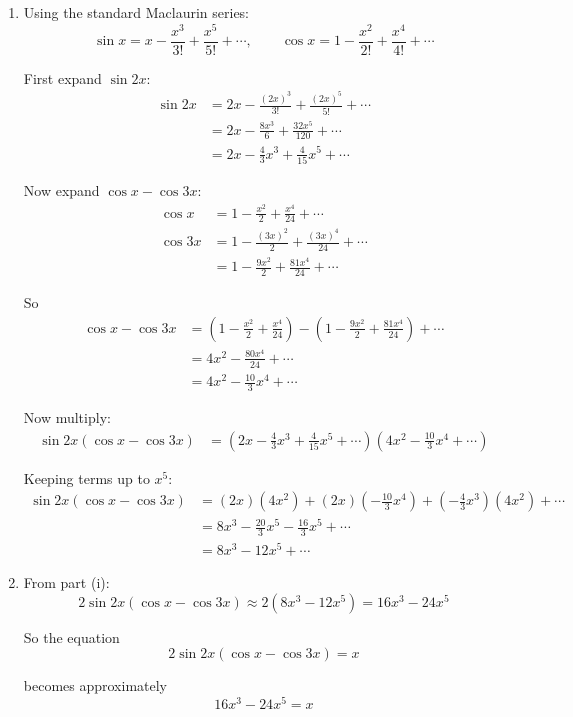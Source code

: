 \documentclass[leqno]{article}
\begin{document}
\begin{enumerate}[
  label=\textbf{\arabic*.},
  leftmargin=*,
  topsep=0pt,
  partopsep=0pt,
  parsep=0pt
]
\begin{djsSolution}
\begin{enumerate}[label=\textbf{(\roman*)}]
\item Using the standard Maclaurin series:
\[
\sin x=x-\frac{x^3}{3!}+\frac{x^5}{5!}+\cdots,
\qquad
\cos x=1-\frac{x^2}{2!}+\frac{x^4}{4!}+\cdots
\]

First expand \(\sin 2x\):
\begin{align*}
\sin 2x
&=2x-\frac{(2x)^3}{3!}+\frac{(2x)^5}{5!}+\cdots\\
&=2x-\frac{8x^3}{6}+\frac{32x^5}{120}+\cdots\\
&=2x-\frac{4}{3}x^3+\frac{4}{15}x^5+\cdots
\end{align*}

Now expand \(\cos x-\cos 3x\):
\begin{align*}
\cos x&=1-\frac{x^2}{2}+\frac{x^4}{24}+\cdots\\
\cos 3x&=1-\frac{(3x)^2}{2}+\frac{(3x)^4}{24}+\cdots\\
&=1-\frac{9x^2}{2}+\frac{81x^4}{24}+\cdots
\end{align*}

So
\begin{align*}
\cos x-\cos 3x
&=\left(1-\frac{x^2}{2}+\frac{x^4}{24}\right)-\left(1-\frac{9x^2}{2}+\frac{81x^4}{24}\right)+\cdots\\
&=4x^2-\frac{80x^4}{24}+\cdots\\
&=4x^2-\frac{10}{3}x^4+\cdots
\end{align*}

Now multiply:
\begin{align*}
\sin 2x(\cos x-\cos 3x)
&=\left(2x-\frac{4}{3}x^3+\frac{4}{15}x^5+\cdots\right)\left(4x^2-\frac{10}{3}x^4+\cdots\right)
\end{align*}

Keeping terms up to \(x^5\):
\begin{align*}
\sin 2x(\cos x-\cos 3x)
&=(2x)(4x^2)+(2x)\left(-\frac{10}{3}x^4\right)+\left(-\frac{4}{3}x^3\right)(4x^2)+\cdots\\
&=8x^3-\frac{20}{3}x^5-\frac{16}{3}x^5+\cdots\\
&=8x^3-12x^5+\cdots
\end{align*}

\item From part (i):
\[
2\sin 2x(\cos x-\cos 3x)\approx 2(8x^3-12x^5)=16x^3-24x^5
\]

So the equation
\[
2\sin 2x(\cos x-\cos 3x)=x
\]

becomes approximately
\[
16x^3-24x^5=x
\]


\end{enumerate}
\end{djsSolution}
\end{enumerate}
\end{document}
